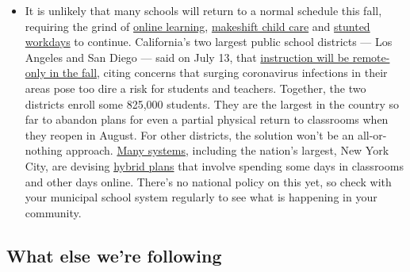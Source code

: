 \begin{itemize}
  \begin{itemize}
  \tightlist
  \item
    It is unlikely that many schools will return to a normal schedule
    this fall, requiring the grind of
    \href{https://www.nytimes.com/2020/06/05/us/coronavirus-education-lost-learning.html?action=click\&pgtype=Article\&state=default\&region=MAIN_CONTENT_3\&context=storylines_faq}{online
    learning},
    \href{https://www.nytimes.com/2020/05/29/us/coronavirus-child-care-centers.html?action=click\&pgtype=Article\&state=default\&region=MAIN_CONTENT_3\&context=storylines_faq}{makeshift
    child care} and
    \href{https://www.nytimes.com/2020/06/03/business/economy/coronavirus-working-women.html?action=click\&pgtype=Article\&state=default\&region=MAIN_CONTENT_3\&context=storylines_faq}{stunted
    workdays} to continue. California's two largest public school
    districts --- Los Angeles and San Diego --- said on July 13, that
    \href{https://www.nytimes.com/2020/07/13/us/lausd-san-diego-school-reopening.html?action=click\&pgtype=Article\&state=default\&region=MAIN_CONTENT_3\&context=storylines_faq}{instruction
    will be remote-only in the fall}, citing concerns that surging
    coronavirus infections in their areas pose too dire a risk for
    students and teachers. Together, the two districts enroll some
    825,000 students. They are the largest in the country so far to
    abandon plans for even a partial physical return to classrooms when
    they reopen in August. For other districts, the solution won't be an
    all-or-nothing approach.
    \href{https://bioethics.jhu.edu/research-and-outreach/projects/eschool-initiative/school-policy-tracker/}{Many
    systems}, including the nation's largest, New York City, are
    devising
    \href{https://www.nytimes.com/2020/06/26/us/coronavirus-schools-reopen-fall.html?action=click\&pgtype=Article\&state=default\&region=MAIN_CONTENT_3\&context=storylines_faq}{hybrid
    plans} that involve spending some days in classrooms and other days
    online. There's no national policy on this yet, so check with your
    municipal school system regularly to see what is happening in your
    community.
  \end{itemize}
\end{itemize}

\hypertarget{what-else-were-following}{%
\subsection{What else we're following}\label{what-else-were-following}}


